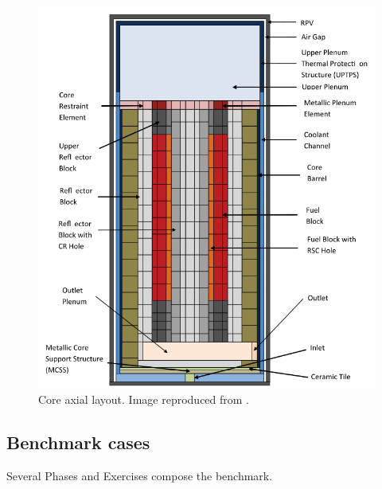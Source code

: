 \documentclass{anstrans}
\begin{document}
\begin{figure}[htbp!]
	\centering
	\includegraphics[width=0.95\linewidth]{figures/axial-layout.png}
	\hfill
	\caption{Core axial layout. Image reproduced from \cite{oecd_nea_benchmark_2017}.}
	\label{fig:axial}
\end{figure}

\subsection{Benchmark cases}

Several Phases and Exercises compose the benchmark.
\end{document}
